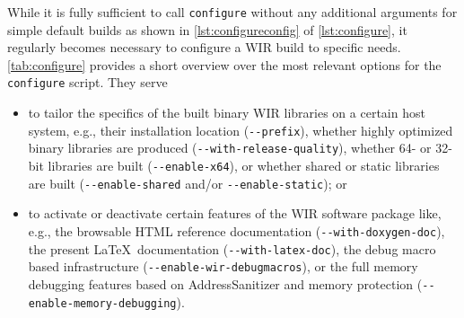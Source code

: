 While it is fully sufficient to call \texttt{configure} without any additional arguments for simple default builds as shown in \cref{lst:configureconfig} of \cref{lst:configure}, it regularly becomes necessary to configure a \gls{WIR} build to specific needs.
\cref{tab:configure} provides a short overview over the most relevant options for the \texttt{configure} script.
They serve
\begin{itemize}
  \item to tailor the specifics of the built binary \gls{WIR} libraries on a certain host system, e.g., their installation location (\texttt{-{}-prefix}), whether highly optimized binary libraries are produced (\texttt{-{}-with-release-quality}), whether 64- or 32-bit libraries are built (\texttt{-{}-enable-x64}), or whether shared or static libraries are built (\texttt{-{}-enable-shared} and/or \texttt{-{}-enable-static}); or
  \item to activate or deactivate certain features of the \gls{WIR} software package like, e.g., the browsable HTML reference documentation (\texttt{-{}-with-doxygen-doc}), the present \LaTeX\ documentation (\texttt{-{}-with-latex-doc}), the debug macro based infrastructure (\texttt{-{}-enable-wir-debugmacros}), or the full memory debugging features based on AddressSanitizer and memory protection (\texttt{-{}-enable-memory-debugging}).
\end{itemize}

